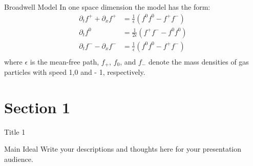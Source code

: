 \documentclass[12pt,xcolor={table,dvipsnames},t]{beamer}
\begin{document}
\begin{frame}{Broadwell Model}
In one space dimension the model has the form:
\begin{equation}
\label{Broad}
\begin{aligned}
    \partial_{t}f^+ + \partial{_x}f^+ &= \frac{1}{\epsilon}(f^0f^0-f^+f^-)\\
    \partial{_t}f^0 &= \frac{1}{2\epsilon}(f^+f^--f^0f^0)\\
    \partial{_t}f^- - \partial{_x}f^- &= \frac{1}{\epsilon}(f^0f^0 - f^+f^-)\\
\end{aligned}
\end{equation}
where $\epsilon$ is the mean-free path, $f_+$, $f_0$, and $f_-$ denote the mass densities of gas particles with speed 1,0 and - 1, respectively.
\end{frame}


\section{Section 1}

\begin{frame}{Title 1}

\begin{block}{Main Ideal}
Write your descriptions and thoughts here for your presentation audience.
\end{block}

\end{frame}
\end{document}
